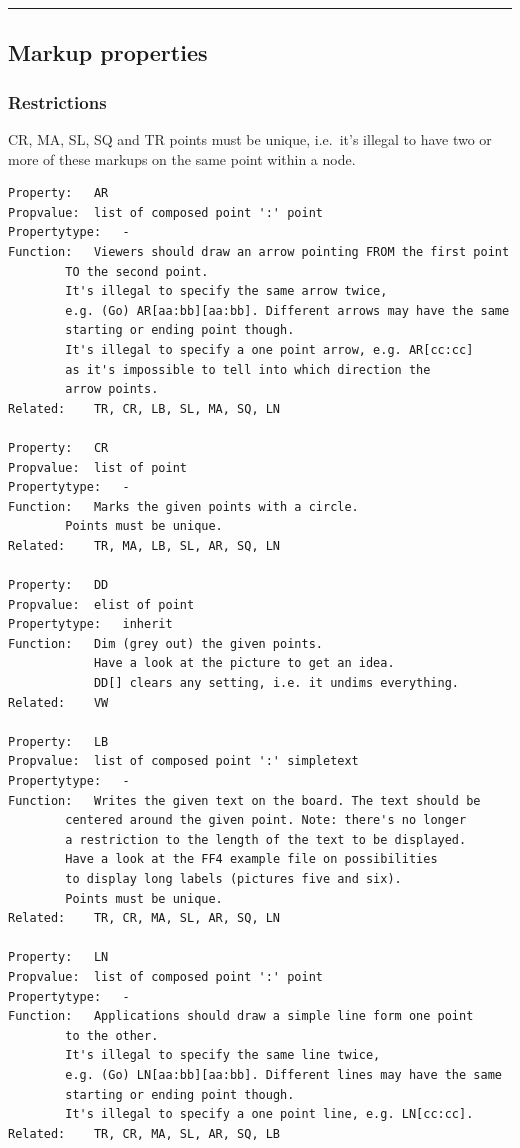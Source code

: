 \begin{center}\rule{0.5\linewidth}{0.5pt}\end{center}

\subsection{Markup properties}\label{markup-properties}

\subsubsection{Restrictions}\label{restrictions-2}

CR, MA, SL, SQ and TR points must be unique, i.e.~it's illegal to have
two or more of these markups on the same point within a node.

\begin{verbatim}
Property:   AR
Propvalue:  list of composed point ':' point
Propertytype:   -
Function:   Viewers should draw an arrow pointing FROM the first point
        TO the second point.
        It's illegal to specify the same arrow twice,
        e.g. (Go) AR[aa:bb][aa:bb]. Different arrows may have the same
        starting or ending point though.
        It's illegal to specify a one point arrow, e.g. AR[cc:cc]
        as it's impossible to tell into which direction the
        arrow points.
Related:    TR, CR, LB, SL, MA, SQ, LN

Property:   CR
Propvalue:  list of point
Propertytype:   -
Function:   Marks the given points with a circle.
        Points must be unique.
Related:    TR, MA, LB, SL, AR, SQ, LN

Property:   DD
Propvalue:  elist of point
Propertytype:   inherit
Function:   Dim (grey out) the given points.
            Have a look at the picture to get an idea.
            DD[] clears any setting, i.e. it undims everything.
Related:    VW

Property:   LB
Propvalue:  list of composed point ':' simpletext
Propertytype:   -
Function:   Writes the given text on the board. The text should be
        centered around the given point. Note: there's no longer
        a restriction to the length of the text to be displayed.
        Have a look at the FF4 example file on possibilities
        to display long labels (pictures five and six).
        Points must be unique.
Related:    TR, CR, MA, SL, AR, SQ, LN

Property:   LN
Propvalue:  list of composed point ':' point
Propertytype:   -
Function:   Applications should draw a simple line form one point
        to the other.
        It's illegal to specify the same line twice,
        e.g. (Go) LN[aa:bb][aa:bb]. Different lines may have the same
        starting or ending point though.
        It's illegal to specify a one point line, e.g. LN[cc:cc].
Related:    TR, CR, MA, SL, AR, SQ, LB


\end{verbatim}
